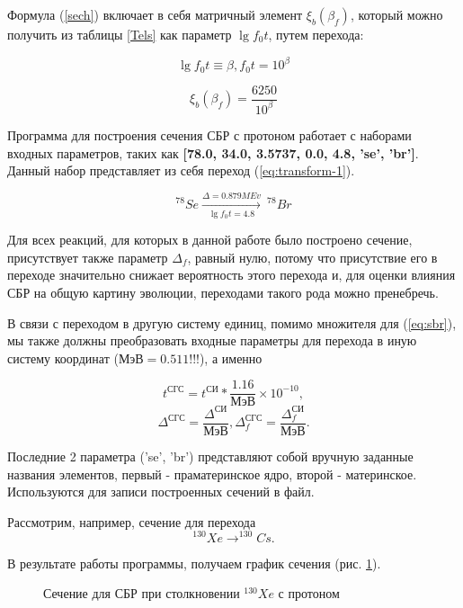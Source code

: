 \documentclass[%
master,    %
natbib,      %
subf,        %
href,        %
colorlinks,  %
]{disser}
\begin{document}
Формула (\ref{sech}) включает в себя матричный элемент $\xi_b(\beta_f)$, который можно получить из таблицы \ref{Tels} как  параметр $\lg f_0 t$, путем перехода:

$$
\lg f_0 t \equiv \beta, f_0 t = 10^\beta
$$

$$
\xi_b(\beta_f) = \frac{6250}{10^\beta}
$$

Программа для построения сечения СБР с протоном работает с наборами входных параметров, таких как \textbf{[78.0, 34.0, 3.5737, 0.0, 4.8, 'se', 'br']}. Данный набор представляет из себя переход (\ref{eq:transform-1}).

\begin{equation}
\label{eq:transform-1}
^{78}Se \xrightarrow[\lg f_0 t = 4.8]{\Delta = 0.879 MEv}  \ ^{78}Br
\end{equation}

Для всех реакций, для которых в данной работе было построено сечение, присутствует также параметр $\Delta_f$, равный нулю, потому что присутствие его в переходе значительно снижает вероятность этого перехода и, для оценки влияния СБР на общую картину эволюции, переходами такого рода можно пренебречь.

В связи с переходом в другую систему единиц, помимо множителя для (\ref{eq:sbr}),  мы также должны преобразовать входные параметры для перехода в иную систему координат ($\text{МэВ} = 0.511 $!!!), а именно

$$
t^{\text{СГС}} = t^{\text{СИ}} * \frac{1.16}{\text{МэВ}} \times 10^{-10},
$$
$$
\Delta^{\text{СГС}} = \frac{\Delta^{\text{СИ}}}{\text{МэВ}}, \Delta_f^{\text{СГС}} = \frac{\Delta_f^{\text{СИ}}}{\text{МэВ}}.
$$

Последние 2 параметра ('se', 'br') представляют собой вручную заданные названия элементов, первый - праматеринское ядро, второй - материнское. Используются для записи построенных сечений в файл. 

Рассмотрим, например, сечение для перехода 
$$^{130}Xe \to ^{130}Cs.$$

В результате работы программы, получаем график сечения  (рис. \ref{ris:1}).

\begin{figure}
	\caption{Сечение для СБР при столкновении $^{130}Xe$ с протоном}
	\label{ris:1}
\end{figure}
\end{document}
